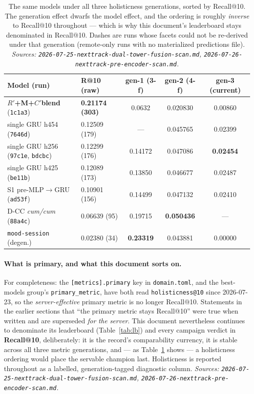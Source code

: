 \documentclass[11pt]{article}
\newcommand{\best}[1]{\textbf{#1}}
\newcommand{\Rp}{\ensuremath{R'}}
\newcommand{\Cp}{\ensuremath{C'}}
\begin{document}
\begin{table}[ht]
  \centering
  \caption{The same models under all three holisticness generations, sorted by
  Recall@10. The generation effect dwarfs the model effect, and the ordering is
  roughly \emph{inverse} to Recall@10 throughout --- which is why this document's
  leaderboard stays denominated in Recall@10. Dashes are runs whose facets could
  not be re-derived under that generation (remote-only runs with no materialized
  predictions file). \emph{Sources:
  \texttt{2026-07-25-nexttrack-dual-tower-fusion-scan.md},
  \texttt{2026-07-26-nexttrack-pre-encoder-scan.md}.}}
  \label{tab:hgen}
  {\footnotesize\setlength{\tabcolsep}{2.4pt}\begin{tabular}{llccc}
    \toprule
    Model (run) & R@10 (raw) & gen-1 (3-f) & gen-2 (4-f) & gen-3 (current) \\
    \midrule
    \best{\Rp+M+\Cp blend} (\texttt{1c1a3}) & \best{0.21174 (303)} & 0.0632 & 0.020830 & 0.00860 \\
    single GRU h454 (\texttt{7646d}) & 0.12509 (179) & --- & 0.045765 & 0.02399 \\
    single GRU h256 (\texttt{97c1e}, \texttt{bdcbc}) & 0.12299 (176) & 0.14172 & 0.047086 & \best{0.02454} \\
    single GRU h425 (\texttt{be11b}) & 0.12089 (173) & 0.13850 & 0.046677 & 0.02487 \\
    S1 pre-MLP$\to$GRU (\texttt{ad53f}) & 0.10901 (156) & 0.14499 & 0.047132 & 0.02410 \\
    D-CC \emph{cum/cum} (\texttt{88a4c}) & 0.06639 (95) & 0.19715 & \best{0.050436} & --- \\
    \texttt{mood-session} (degen.) & 0.02380 (34) & \best{0.23319} & 0.043881 & 0.00000 \\
    \bottomrule
  \end{tabular}}
\end{table}

\paragraph{What is primary, and what this document sorts on.} For completeness:
the \texttt{[metrics].primary} key in \texttt{domain.toml}, and the best-models
group's \texttt{primary\_metric}, have both read \texttt{holisticness@10} since
2026-07-23, so the \emph{server-effective} primary metric is no longer
Recall@10. Statements
in the earlier sections that ``the primary metric stays Recall@10'' were true
when written and are superseded \emph{for the server}. This document
nevertheless continues to denominate its leaderboard
(Table~\ref{tab:lb}) and every campaign verdict in \textbf{Recall@10},
deliberately: it is the record's comparability currency, it is stable across all
three metric generations, and --- as Table~\ref{tab:hgen} shows --- a
holisticness ordering would place the servable champion last. Holisticness is
reported throughout as a labelled, generation-tagged diagnostic column.
\emph{Sources: \texttt{2026-07-25-nexttrack-dual-tower-fusion-scan.md},
\texttt{2026-07-26-nexttrack-pre-encoder-scan.md}.}
\end{document}
